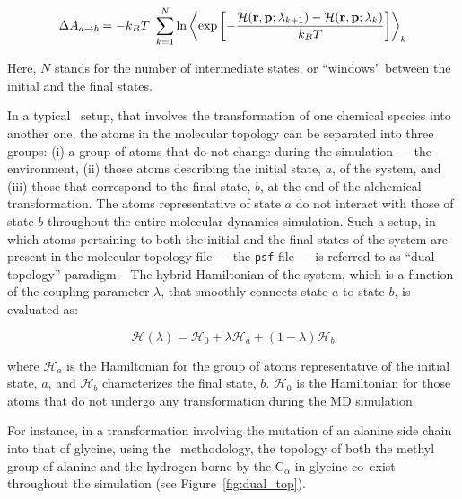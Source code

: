 \begin{equation}
\Delta A_{a \rightarrow b} = -k_B T \ \sum_{k = 1}^N \ln
\left< \exp\left[-\frac{{\mathcal H}({\bf r}, {\bf p}; \lambda_{k+1}) - 
                        {\mathcal H}({\bf r}, {\bf p}; \lambda_k)}
                        {k_B T}\right]
\right>_k
\end{equation}

Here, $N$ stands for the number of intermediate states, or ``windows''
between the initial and the final states.


In a typical \FEP\ setup, that involves the transformation
of one chemical species 
into another one, the atoms in the molecular topology can be 
separated into three groups: (i) a group of atoms that do not change 
during the simulation --- \eg the environment, (ii) 
those atoms describing the initial state, $a$, of the system, and (iii) 
those that correspond to the final state, $b$, at the end of the 
alchemical transformation. 
The atoms representative of state $a$
do not interact with those of state $b$ throughout the 
entire molecular dynamics simulation. 
Such a setup, in which atoms pertaining to both the initial and the
final states of the system are present in the molecular topology file --- \ie 
the {\tt psf} file --- is referred to as ``dual topology'' 
paradigm.~\cite{Axelsen.98,Pearlman.94}
The hybrid Hamiltonian of the system, which is a function of the
coupling parameter $\lambda$, that smoothly connects state $a$
to state $b$, is evaluated as:

\begin{equation}
{\mathcal H}(\lambda) = {\mathcal H}_0 
                      + \lambda {\mathcal H}_a 
                      + (1-\lambda) {\mathcal H}_b
\end{equation}

where ${\mathcal H}_a$ is the Hamiltonian for the group of atoms representative
of the initial state, $a$, and ${\mathcal H}_b$ characterizes the final state,
$b$. ${\mathcal H}_0$ is the Hamiltonian for those atoms that do not undergo any 
transformation during the MD simulation.


For instance, in a transformation involving the mutation of an
alanine side chain into that of glycine, using the \FEP \ methodology, 
the topology of both the methyl group of alanine
and the hydrogen borne by the C$_\alpha$ in glycine co--exist
throughout the simulation (see Figure~\ref{fig:dual_top}).


